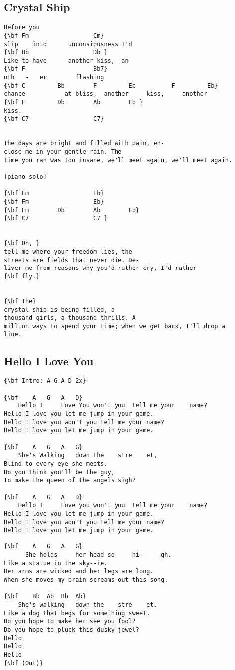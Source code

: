 \documentclass[a4paper]{article}
\begin{document}
\subsection{Crystal Ship} %
\label{sub:Crystal Ship}
\begin{Verbatim}[commandchars=\\\{\}]
Before you 
{\bf Fm                  Cm}
slip    into      unconsiousness I'd
{\bf Bb                  Db }
Like to have      another kiss,  an-
{\bf F                   Bb7}
oth   -   er        flashing 
{\bf C         Bb        F         Eb          F         Eb}
chance           at bliss,  another     kiss,     another
{\bf F         Db        Ab        Eb }
kiss.
{\bf C7                  C7}


The days are bright and filled with pain, en-
close me in your gentle rain. The
time you ran was too insane, we'll meet again, we'll meet again.

[piano solo]

{\bf Fm                  Eb}
{\bf Fm                  Eb}
{\bf Fm        Db        Ab        Eb}
{\bf C7                  C7 }


{\bf Oh, }
tell me where your freedom lies, the
streets are fields that never die. De-
liver me from reasons why you'd rather cry, I'd rather
{\bf fly.}


{\bf The}
crystal ship is being filled, a
thousand girls, a thousand thrills. A
million ways to spend your time; when we get back, I'll drop a 
line. 
\end{Verbatim}
\newpage
\subsection{Hello I Love You} %
\label{sub:Hello I Love You}
\begin{Verbatim}[commandchars=\\\{\}]
{\bf Intro: A G A D 2x}

{\bf  	A	G	A	D}
 	Hello I 	Love You won't you 	tell me your 	name?
Hello I love you let me jump in your game.
Hello I love you won't you tell me your name?
Hello I love you let me jump in your game.

{\bf  	A	G	A	G}
 	She's Walking 	down the 	stre	et,
Blind to every eye she meets.
Do you think you'll be the guy,
To make the queen of the angels sigh?

{\bf  	A	G	A	D}
 	Hello I 	Love you won't you 	tell me your 	name?
Hello I love you let me jump in your game.
Hello I love you won't you tell me your name?
Hello I love you let me jump in your game.

{\bf  	A	G	A	G}
 	  She holds 	her head so 	hi--	gh.
Like a statue in the sky--ie.
Her arms are wicked and her legs are long.
When she moves my brain screams out this song.

{\bf  	Bb	Ab	Bb	Ab}
 	She's walking 	down the 	stre	et.
Like a dog that begs for something sweet.
Do you hope to make her see you fool?
Do you hope to pluck this dusky jewel?
Hello
Hello
Hello
{\bf (Out)}
\end{Verbatim}
\newpage
\end{document}
